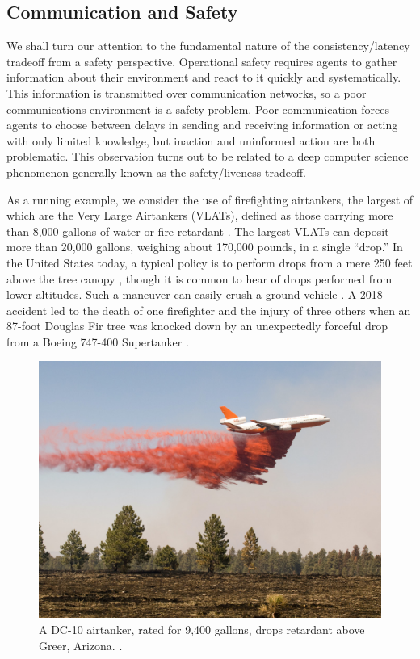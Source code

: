 \documentclass[]             %
{NASA}                       %
\theoremstyle{definition}
\begin{document}
\subsection{Communication and Safety}
\label{communication-and-safety}
We shall turn our attention to the fundamental nature of the consistency/latency tradeoff from a safety
perspective. Operational safety requires agents to gather information about their
environment and react to it quickly and systematically. This
information is transmitted over communication networks, so a poor
communications environment is a safety problem. Poor communication
forces agents to choose between delays in sending and receiving
information or acting with only limited knowledge, but inaction and
uninformed action are both problematic. This observation turns out to
be related to a deep computer science phenomenon generally known as the
safety/liveness tradeoff.

As a running example, we consider the use of firefighting airtankers,
the largest of which are the Very Large Airtankers (VLATs), defined as
those carrying more than 8,000 gallons of water or fire retardant
\cite{2019:airtankerops}. The largest VLATs can deposit more than
20,000 gallons, weighing about 170,000 pounds, in a single ``drop.''
In the United States today, a typical policy is to perform drops from
a mere 250 feet above the tree canopy \cite{2019:airtankerops}, though
it is common to hear of drops performed from lower altitudes. Such a
maneuver can easily crush a ground vehicle \cite{2019:stickney}. A
2018 accident led to the death of one firefighter and the injury of
three others when an 87-foot Douglas Fir tree was knocked down by an
unexpectedly forceful drop from a Boeing 747-400 Supertanker
\cite{2018:calfire}.

\begin{figure}[h]
  \label{fig:airtanker}
  \centering
  \includegraphics[scale=0.4]{images/dc10.jpg}
  \caption{A DC-10 airtanker, rated for 9,400 gallons, drops retardant above Greer, Arizona. \citationneeded.}
\end{figure}
\end{document}
